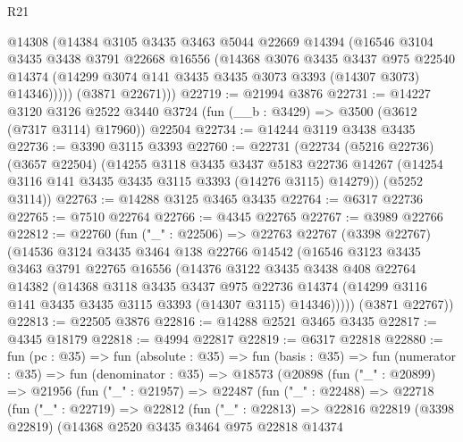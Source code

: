 \begin{lexlean}{R21}
\begin{coremodule}
          @14308
          (@14384
            @3105
            @3435
            @3463
            @5044
            @22669
            @14394
            (@16546
              @3104
              @3435
              @3438
              @3791
              @22668
              @16556
              (@14368
                @3076
                @3435
                @3437
                @975
                @22540
                @14374
                (@14299 @3074 @141 @3435 @3435 @3073 @3393 (@14307 @3073) @14346)))))
        (@3871 @22671)))
@22719 := @21994 @3876
@22731 := @14227
    @3120
    @3126
    @2522
    @3440
    @3724
    (fun (__b : @3429) => @3500 (@3612 (@7317 @3114) @17960))
    @22504
@22734 := @14244 @3119 @3438 @3435
@22736 := @3390 @3115 @3393
@22760 := @22731
    (@22734
      (@5216 @22736)
      (@3657 @22504)
      (@14255
        @3118
        @3435
        @3437
        @5183
        @22736
        @14267
        (@14254 @3116 @141 @3435 @3435 @3115 @3393 (@14276 @3115) @14279))
      (@5252 @3114))
@22763 := @14288 @3125 @3465 @3435
@22764 := @6317 @22736
@22765 := @7510 @22764
@22766 := @4345 @22765
@22767 := @3989 @22766
@22812 := @22760
    (fun ("_" : @22506) =>
    @22763
      @22767
      (@3398 @22767)
      (@14536
        @3124
        @3435
        @3464
        @138
        @22766
        @14542
        (@16546
          @3123
          @3435
          @3463
          @3791
          @22765
          @16556
          (@14376
            @3122
            @3435
            @3438
            @408
            @22764
            @14382
            (@14368
              @3118
              @3435
              @3437
              @975
              @22736
              @14374
              (@14299 @3116 @141 @3435 @3435 @3115 @3393 (@14307 @3115) @14346)))))
      (@3871 @22767))
@22813 := @22505 @3876
@22816 := @14288 @2521 @3465 @3435
@22817 := @4345 @18179
@22818 := @4994 @22817
@22819 := @6317 @22818
@22880 := fun (pc : @35) =>
  fun (absolute : @35) =>
  fun (basis : @35) =>
  fun (numerator : @35) =>
  fun (denominator : @35) =>
  @18573
    (@20898
      (fun ("_" : @20899) =>
      @21956
        (fun ("_" : @21957) =>
        @22487
          (fun ("_" : @22488) =>
          @22718
            (fun ("_" : @22719) =>
            @22812
              (fun ("_" : @22813) =>
              @22816
                @22819
                (@3398 @22819)
                (@14368
                  @2520
                  @3435
                  @3464
                  @975
                  @22818
                  @14374

\end{coremodule}
\end{lexlean}
